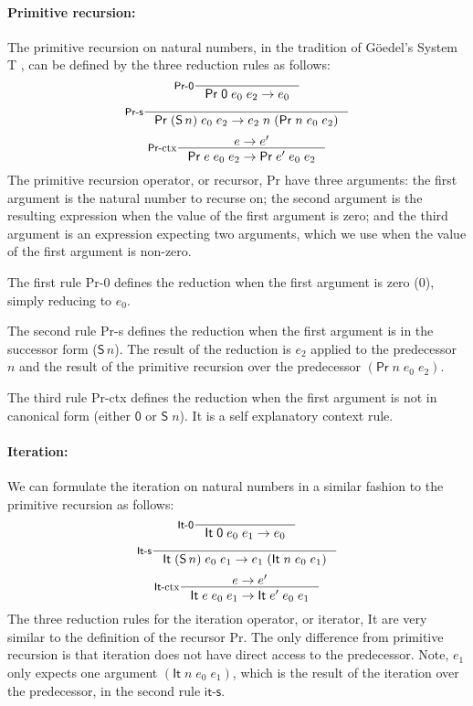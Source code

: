 \paragraph{Primitive recursion:} The primitive recursion on natural numbers,
in the tradition of G\"oedel's System \textsf{T} \cite{God58},
can be defined by the three reduction rules as follows:
\[\inference[\textsf{Pr-0}]{}{\mathsf{Pr}\;\mathsf{0}\;e_0\;e_2 \to e_0}\]
\[\inference[\textsf{Pr-s}]{}{\mathsf{Pr}\;(\mathsf{S}\,n)\;e_0\;e_2 \to
                              e_2\;n\;(\mathsf{Pr}\;n\;e_0\;e_2)}\]
\[\inference[\textsf{Pr-}ctx]{e\to e'}
       {\mathsf{Pr}\;e\;e_0\;e_2 \to \mathsf{Pr}\;e'\;e_0\;e_2} \]
The primitive recursion operator, or recursor, \textsf{Pr} have three arguments:
the first argument is the natural number to recurse on;
the second argument is the resulting expression
when the value of the first argument is zero; and
the third argument is an expression expecting two arguments,
which we use when the value of the first argument is non-zero.

The first rule \textsf{Pr-0} defines the reduction when the first argument
is zero (\textsf{0}), simply reducing to $e_0$.

The second rule \textsf{Pr-s} defines the reduction when the first argument
is in the successor form ($\mathsf{S}\,n$). The result of the reduction is
$e_2$ applied to the predecessor $n$ and the result of the primitive recursion
over the predecessor $(\mathsf{Pr}\;n\;e_0\;e_2)$.

The third rule \textsf{Pr-}ctx defines the reduction when the first argument
is not in canonical form (\ie either $\mathsf{0}$ or $\mathsf{S}\;n$).
It is a self explanatory context rule.

\paragraph{Iteration:} We can formulate the iteration on natural numbers
in a similar fashion to the primitive recursion as follows:
\[\inference[\textsf{It-0}]{}{\mathsf{It}\;\mathsf{0}\;e_0\;e_1 \to e_0}\]
\[\inference[\textsf{It-s}]{}{\mathsf{It}\;(\mathsf{S}\,n)\;e_0\;e_1 \to
                              e_1\;(\mathsf{It}\;n\;e_0\;e_1)}\]
\[\inference[\textsf{It-}ctx]{e\to e'}
                   {\mathsf{It}\;e\;e_0\;e_1 \to \mathsf{It}\;e'\;e_0\;e_1} \]
The three reduction rules for the iteration operator, or iterator, \textsf{It}
are very similar to the definition of the recursor \textsf{Pr}.
The only difference from primitive recursion is that iteration does not have
direct access to the predecessor. Note, $e_1$ only expects one argument
$(\mathsf{It}\;n\;e_0\;e_1)$, which is the result of the iteration over
the predecessor, in the second rule $\textsf{it-s}$.

